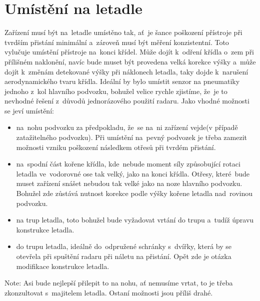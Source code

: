 	\section{Umístění na letadle}\label{navrhReseni::umisteniNaLetadle}
		Zařízení musí být na~letadle umístěno tak, ať~je šance poškození přístroje při tvrdším přistání minimální a~zároveň musí být měření konzistentní. Toto vylučuje umístění přístroje na~konci křídel. Může dojít k~odření křídla o~zem při přílišném naklonění, navíc bude muset být provedena velká korekce výšky a~může dojít k~změnám detekované výšky při náklonech letadla, taky dojde k~narušení aerodynamického tvaru křídla. Ideální by bylo umístit senzor na pneumatiky jednoho z~kol hlavního podvozku, bohužel velice rychle zjistíme, že~je to nevhodné řešení z~důvodů jednorázového použití radaru. Jako vhodné možnosti se jeví umístění:
		\begin{itemize}
			\item na~nohu podvozku za předpokladu, že~se na~ni zařízení vejde(v případě zatažitelného podvozku). Při umístění na~pevný podvozek je třeba zamezit možnosti vzniku poškození následkem otřesů při tvrdém přistání. 
			\item na~spodní část kořene křídla, kde~nebude moment síly způsobující rotaci letadla ve~vodorovné ose tak velký, jako na konci křídla. Otřesy, které~bude muset zařízení snášet nebudou tak velké jako na noze hlavního podvozku. Bohužel zde zůstává nutnost korekce podle výšky kořene letadla nad~rovinou podvozku.
			\item na trup letadla, toto bohužel bude vyžadovat vrtání do trupu a~tudíž úpravu konstrukce letadla.
			\item do trupu letadla, ideálně do~odpružené schránky s~dvířky, která by se otevřela při spuštění radaru při náletu na přistání. Opět zde je otázka modifikace konstrukce letadla.
		\end{itemize} 
		Note: Asi bude nejlepší přilepit to na nohu, ať nemusíme vrtat, to je třeba zkonzultovat s~majitelem letadla. Ostaní možnosti jsou příliš drahé.


